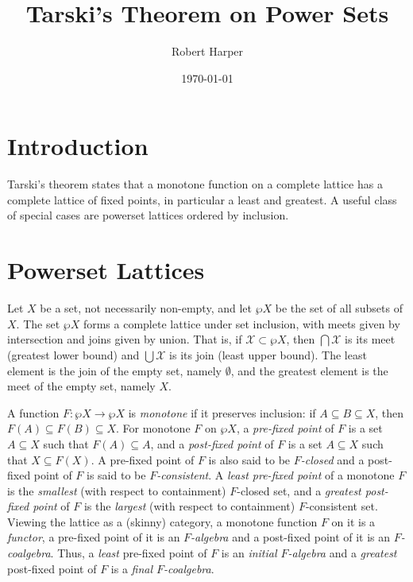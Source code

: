 \documentclass[11pt,twoside]{article}
\begin{document}
\title{Tarski's Theorem on Power Sets}
\author{Robert Harper}
\date{\today}

\maketitle{}

\section{Introduction}

Tarski's theorem states that a monotone function on a complete lattice has a complete
lattice of fixed points, in particular a least and greatest. A useful class of special
cases are powerset lattices ordered by inclusion.

\section{Powerset Lattices}

Let $X$ be a set, not necessarily non-empty, and let $\wp{X}$ be the set of all subsets of
$X$. The set $\wp{X}$ forms a complete lattice under set inclusion, with meets given by
intersection and joins given by union. That is, if $\mathcal{X}\subset\wp{X}$, then
$\bigcap{\mathcal{X}}$ is its meet (greatest lower bound) and $\bigcup{\mathcal{X}}$ is
its join (least upper bound). The least element is the join of the empty set, namely
$\emptyset$, and the greatest element is the meet of the empty set, namely $X$.

A function $F:\wp{X}\to\wp{X}$ is \emph{monotone} if it preserves inclusion: if
$A\subseteq B\subseteq X$, then $F(A)\subseteq F(B)\subseteq X$. For monotone $F$ on
$\wp{X}$, a \emph{pre-fixed point} of $F$ is a set $A\subseteq X$ such that
$F(A)\subseteq A$, and a \emph{post-fixed point} of $F$ is a set $A\subseteq X$ such that
$X\subseteq F(X)$. A pre-fixed point of $F$ is also said to be \emph{$F$-closed} and a post-fixed
point of $F$ is said to be \emph{$F$-consistent}. A \emph{least pre-fixed point} of a
monotone $F$ is the \emph{smallest} (with respect to containment) $F$-closed set, and a
\emph{greatest post-fixed point} of $F$ is the \emph{largest} (with respect to
containment) $F$-consistent set.  Viewing the lattice as a (skinny) category, a monotone
function $F$ on it is a \emph{functor}, a pre-fixed point of it is an \emph{$F$-algebra}
and a post-fixed point of it is an \emph{$F$-coalgebra}. Thus, a \emph{least} pre-fixed
point of $F$ is an \emph{initial $F$-algebra} and a \emph{greatest} post-fixed point of
$F$ is a \emph{final $F$-coalgebra}.
\end{document}
